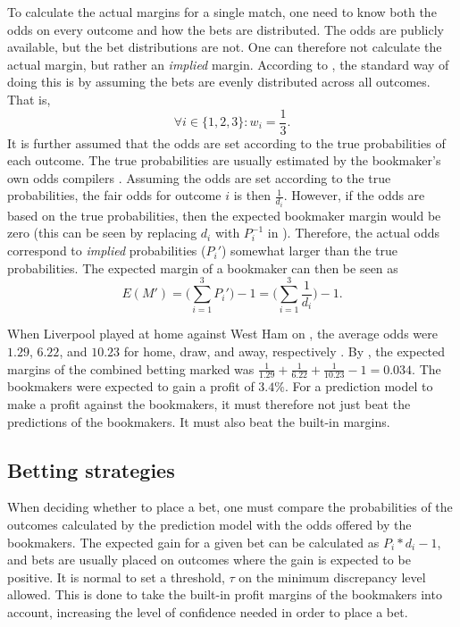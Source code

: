 To calculate the actual margins for a single match, one need to know both the odds on every outcome and how the bets are distributed. The odds are publicly available, but the bet distributions are not. One can therefore not calculate the actual margin, but rather an \textit{implied} margin. According to \citet{bib:vlastakis-dotsis-markellos-2009}, the standard way of doing this is by assuming the bets are evenly distributed across all outcomes. That is,  
\begin{equation*}
    \forall i \in \{1, 2, 3\}: w_{i} = \frac{1}{3}.
\end{equation*}
It is further assumed that the odds are set according to the true probabilities of each outcome. The true probabilities are usually estimated by the bookmaker's own odds compilers \citep{bib:vlastakis-dotsis-markellos-2009}. Assuming the odds are set according to the true probabilities, the fair odds for outcome $i$ is then $\frac{1}{d_{i}}$. However, if the odds are based on the true probabilities, then the expected bookmaker margin would be zero (this can be seen by replacing $d_{i}$ with $P_{i}^{-1}$ in ). Therefore, the actual odds correspond to \textit{implied} probabilities ($P_{i}'$) somewhat larger than the true probabilities. The expected margin of a bookmaker can then be seen as
\begin{equation}
    E(M') = \Bigg(\sum_{i=1}^{3} P_{i}'\Bigg) - 1 = \Bigg(\sum_{i=1}^{3} \frac{1}{d_{i}}\Bigg) - 1.
    \label{eq:bookmaker-implied-margin}
\end{equation}

When Liverpool played at home against West Ham on , the average odds were $1.29$, $6.22$, and $10.23$ for home, draw, and away, respectively \citep{bib:odds-portal}. By , the expected margins of the combined betting marked was $\frac{1}{1.29} + \frac{1}{6.22} + \frac{1}{10.23} - 1 = 0.034$. The bookmakers were expected to gain a profit of $3.4\%$. For a prediction model to make a profit against the bookmakers, it must therefore not just beat the predictions of the bookmakers. It must also beat the built-in margins.

\subsection{Betting strategies}
\label{sec:betting-strategies}

When deciding whether to place a bet, one must compare the probabilities of the outcomes calculated by the prediction model with the odds offered by the bookmakers. The expected gain for a given bet can be calculated as $P_{i} * d_{i} - 1$, and bets are usually placed on outcomes where the gain is expected to be positive. It is normal to set a threshold, $\tau$ on the minimum discrepancy level allowed. This is done to take the built-in profit margins of the bookmakers into account, increasing the level of confidence needed in order to place a bet.

